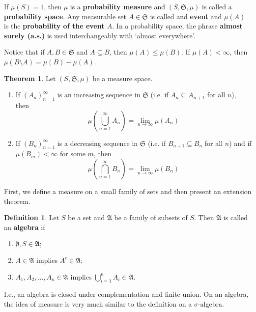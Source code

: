 \documentclass[12pt,a4paper]{article}
\theoremstyle{definition}
\newtheorem{theorem}{Theorem}[section]
\newtheorem{definition}{Definition}[section]
\begin{document}
If $\mu(S) = 1$, then $\mu$ is a \textbf{probability measure} and $(S, \mathfrak{S}, \mu)$ is called a \textbf{probability space}. Any measurable set $A \in \mathfrak{S}$ is called and \textbf{event} and $\mu(A)$ is the \textbf{probability of the event $A$}. In a probability space, the phrase \textbf{almost surely (a.s.)} is used interchangeably with `almost everywhere'.

Notice that if $A, B \in \mathfrak{S}$ and $A \subseteq B$, then $\mu(A) \leq \mu(B)$. If $\mu(A) < \infty$, then $\mu(B \setminus A) = \mu(B) - \mu(A)$.

\begin{theorem}
	Let $(S, \mathfrak{S}, \mu)$ be a measure space.
	\begin{enumerate}
		\item If $(A_n)_{n=1}^\infty$ is an increasing sequence in $\mathfrak{S}$ (i.e. if $A_n \subseteq A_{n+1}$ for all $n$), then \[ \mu \left( \bigcup_{n=1}^\infty A_n \right) = \lim_{n \to \infty} \mu(A_n) \] 
		\item If $(B_n)_{n=1}^\infty$ is a decreasing sequence in $\mathfrak{S}$ (i.e. if $B_{n+1} \subseteq B_n$ for all $n$) and if $\mu(B_m) < \infty$ for some $m$, then \[ \mu \left( \bigcap_{n=1}^\infty B_n \right) = \lim_{n \to \infty} \mu(B_n) \] 
	\end{enumerate}
\end{theorem}

First, we define a measure on a small family of sets and then present an extension theorem.

\begin{definition}
	Let $S$ be a set and $\mathfrak{A}$ be a family of subsets of $S$. Then $\mathfrak{A}$ is called an \textbf{algebra} if 
	\begin{enumerate}
		\item $\emptyset, S \in \mathfrak{A}$;
		\item $A \in \mathfrak{A}$ implies $A^c \in \mathfrak{A}$;
		\item $A_1, A_2, \ldots, A_n \in \mathfrak{A}$ implies $\bigcup_{i=1}^n A_i \in \mathfrak{A}$.
	\end{enumerate}
\end{definition}

I.e., an algebra is closed under complementation and finite union. On an algebra, the idea of measure is very much similar to the definition on a $\sigma$-algebra.
\end{document}
